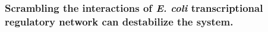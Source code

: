 \documentclass[10pt]{article}
\begin{document}






\subsubsection*{Scrambling the interactions of \textit{E. coli} transcriptional regulatory network can destabilize the system.}
\end{document}
